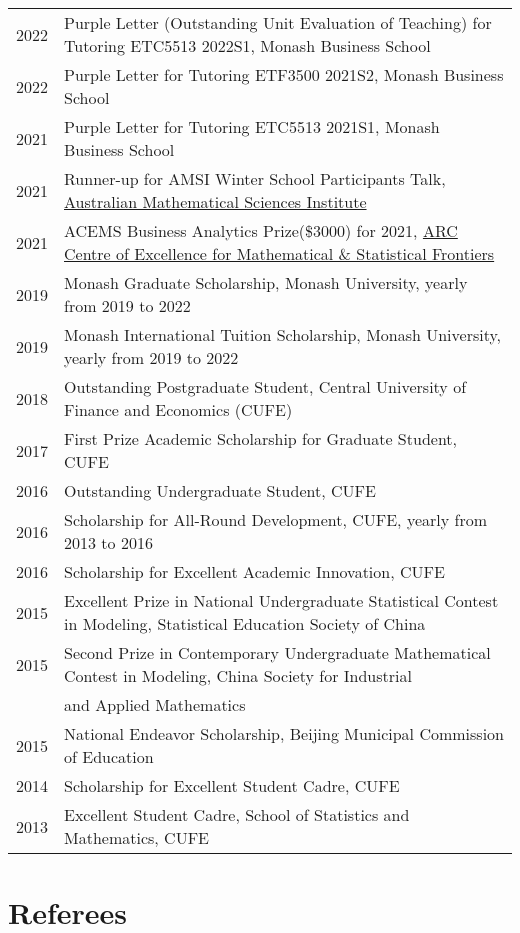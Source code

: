\documentclass[10pt,a4paper,]{article}
\begin{document}
\begin{tabular}{rl}
  2022 & Purple Letter (Outstanding Unit Evaluation of Teaching) for Tutoring ETC5513 2022S1, Monash Business School \\ 
  2022 & Purple Letter for Tutoring ETF3500 2021S2, Monash Business School \\ 
  2021 & Purple Letter for Tutoring ETC5513 2021S1, Monash Business School \\ 
  2021 & Runner-up for AMSI Winter School Participants Talk, \href{https://ws.amsi.org.au/}{Australian Mathematical Sciences Institute} \\ 
  2021 & ACEMS Business Analytics Prize(\$3000) for 2021, \href{https://acems.org.au}{ARC Centre of Excellence for Mathematical \& Statistical Frontiers} \\ 
  2019 & Monash Graduate Scholarship, Monash University, yearly from 2019 to 2022 \\ 
  2019 & Monash International Tuition Scholarship, Monash University, yearly from 2019 to 2022 \\ 
  2018 & Outstanding Postgraduate Student, Central University of Finance and Economics (CUFE) \\ 
  2017 & First Prize Academic Scholarship for Graduate Student, CUFE \\ 
  2016 & Outstanding Undergraduate Student, CUFE \\ 
  2016 & Scholarship for All-Round Development, CUFE, yearly from 2013 to 2016 \\ 
  2016 & Scholarship for Excellent Academic Innovation, CUFE \\ 
  2015 & Excellent Prize in National Undergraduate Statistical Contest in Modeling, Statistical Education Society of China \\ 
  2015 & Second Prize in Contemporary Undergraduate Mathematical Contest in Modeling, China Society for Industrial \\
       & and Applied Mathematics \\ 
  2015 & National Endeavor Scholarship, Beijing Municipal Commission of Education \\ 
  2014 & Scholarship for Excellent Student Cadre, CUFE \\ 
  2013 & Excellent Student Cadre, School of Statistics and Mathematics, CUFE \\ 
\end{tabular}

\hypertarget{referees}{%
\section{Referees}\label{referees}}
\end{document}
